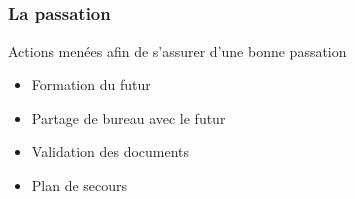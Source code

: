 \subsection{}
\begin{frame}
\frametitle{La passation}
\begin{block}{Actions menées afin de s'assurer d'une bonne passation}
\begin{itemize}
	\item Formation du futur \CP{}
	\item Partage de bureau avec le futur \CP{}
	\item Validation des documents
	\item Plan de secours
\end{itemize}
\end{block}
\end{frame}



